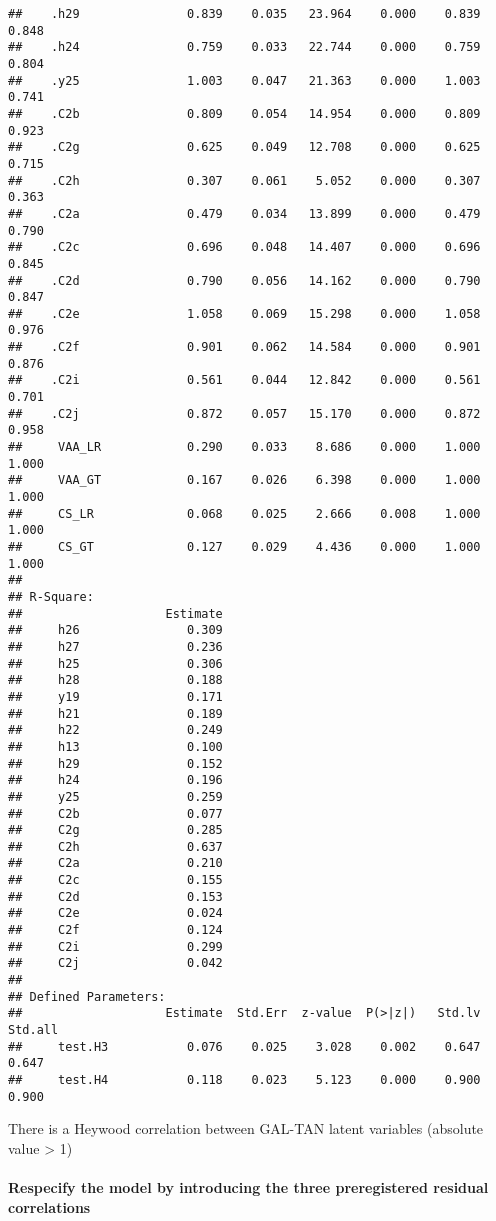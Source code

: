 \documentclass[
]{article}
\begin{document}
\begin{verbatim}
##    .h29               0.839    0.035   23.964    0.000    0.839    0.848
##    .h24               0.759    0.033   22.744    0.000    0.759    0.804
##    .y25               1.003    0.047   21.363    0.000    1.003    0.741
##    .C2b               0.809    0.054   14.954    0.000    0.809    0.923
##    .C2g               0.625    0.049   12.708    0.000    0.625    0.715
##    .C2h               0.307    0.061    5.052    0.000    0.307    0.363
##    .C2a               0.479    0.034   13.899    0.000    0.479    0.790
##    .C2c               0.696    0.048   14.407    0.000    0.696    0.845
##    .C2d               0.790    0.056   14.162    0.000    0.790    0.847
##    .C2e               1.058    0.069   15.298    0.000    1.058    0.976
##    .C2f               0.901    0.062   14.584    0.000    0.901    0.876
##    .C2i               0.561    0.044   12.842    0.000    0.561    0.701
##    .C2j               0.872    0.057   15.170    0.000    0.872    0.958
##     VAA_LR            0.290    0.033    8.686    0.000    1.000    1.000
##     VAA_GT            0.167    0.026    6.398    0.000    1.000    1.000
##     CS_LR             0.068    0.025    2.666    0.008    1.000    1.000
##     CS_GT             0.127    0.029    4.436    0.000    1.000    1.000
## 
## R-Square:
##                    Estimate
##     h26               0.309
##     h27               0.236
##     h25               0.306
##     h28               0.188
##     y19               0.171
##     h21               0.189
##     h22               0.249
##     h13               0.100
##     h29               0.152
##     h24               0.196
##     y25               0.259
##     C2b               0.077
##     C2g               0.285
##     C2h               0.637
##     C2a               0.210
##     C2c               0.155
##     C2d               0.153
##     C2e               0.024
##     C2f               0.124
##     C2i               0.299
##     C2j               0.042
## 
## Defined Parameters:
##                    Estimate  Std.Err  z-value  P(>|z|)   Std.lv  Std.all
##     test.H3           0.076    0.025    3.028    0.002    0.647    0.647
##     test.H4           0.118    0.023    5.123    0.000    0.900    0.900
\end{verbatim}

There is a Heywood correlation between GAL-TAN latent variables
(absolute value \textgreater{} 1)

\newpage

\hypertarget{respecify-the-model-by-introducing-the-three-preregistered-residual-correlations-1}{%
\paragraph{Respecify the model by introducing the three preregistered
residual
correlations}\label{respecify-the-model-by-introducing-the-three-preregistered-residual-correlations-1}}
\end{document}
